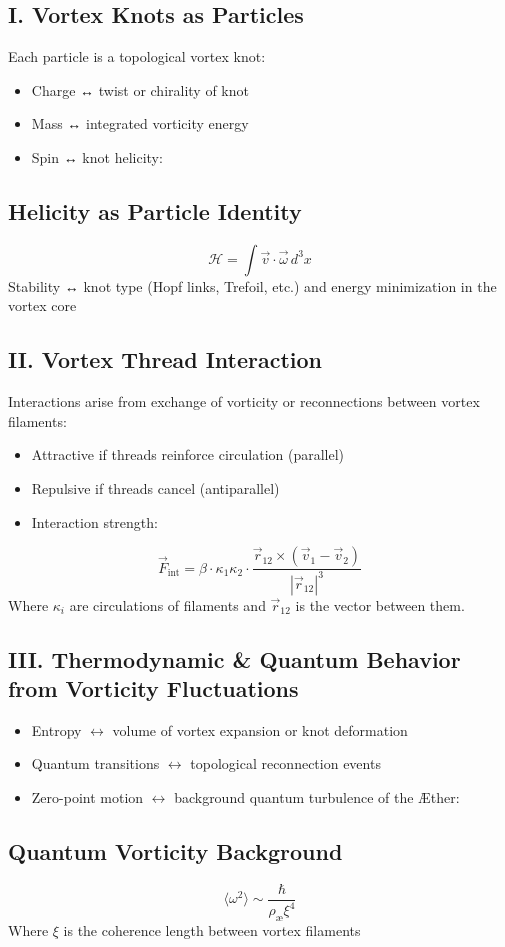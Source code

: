 \subsection*{I. Vortex Knots as Particles}
Each particle is a topological vortex knot:
\begin{itemize}
    \item Charge ↔ twist or chirality of knot
    \item Mass ↔ integrated vorticity energy
    \item Spin ↔ knot helicity:
\end{itemize}
\subsection*{Helicity as Particle Identity}
\begin{equation}
    \mathcal{H} = \int \vec{v} \cdot \vec{\omega} \, d^3x
\end{equation}
Stability ↔ knot type (Hopf links, Trefoil, etc.) and energy minimization in the vortex core

\subsection*{II. Vortex Thread Interaction}
Interactions arise from exchange of vorticity or reconnections between vortex filaments:
\begin{itemize}
    \item Attractive if threads reinforce circulation (parallel)
    \item Repulsive if threads cancel (antiparallel)
    \item Interaction strength:
\end{itemize}
\begin{equation}
    \vec{F}_{\text{int}} = \beta \cdot \kappa_1 \kappa_2 \cdot \frac{\vec{r}_{12} \times (\vec{v}_1 - \vec{v}_2)}{|\vec{r}_{12}|^3}
\end{equation}
Where \(\kappa_i\) are circulations of filaments and \(\vec{r}_{12}\) is the vector between them.


\subsection*{III. Thermodynamic & Quantum Behavior from Vorticity Fluctuations}
\begin{itemize}
    \item Entropy \(\leftrightarrow\) volume of vortex expansion or knot deformation
    \item Quantum transitions \(\leftrightarrow\) topological reconnection events
    \item Zero-point motion \(\leftrightarrow\) background quantum turbulence of the Æther:
\end{itemize}
\subsection*{Quantum Vorticity Background}
\begin{equation}
    \langle \omega^2 \rangle \sim \frac{\hbar}{\rho_\text{æ} \xi^4}
\end{equation}
Where \(\xi\) is the coherence length between vortex filaments